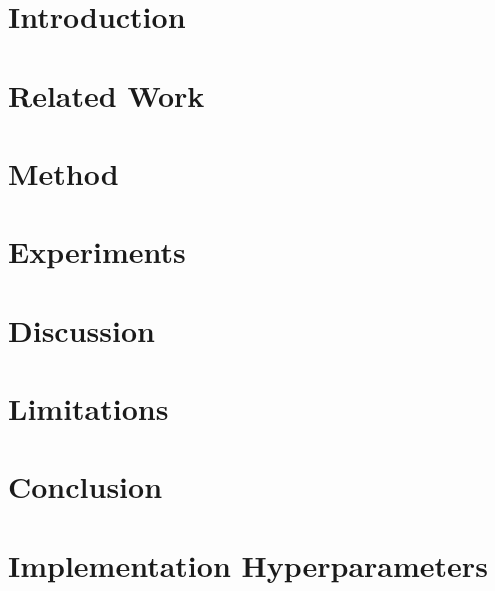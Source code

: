 \documentclass{article}
\begin{document}
\begin{abstract}
\end{abstract}


\section{Introduction}


\section{Related Work}


\section{Method}


\section{Experiments}


\section{Discussion}


\section{Limitations}


\section{Conclusion}





\clearpage
\appendix
\section{Implementation Hyperparameters}
\label{sec:appendix-implementation}

\end{document}
